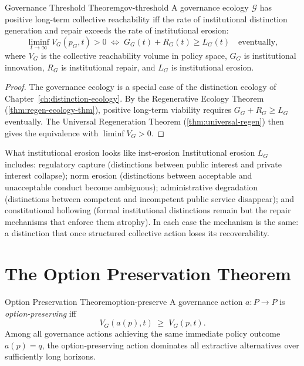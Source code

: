 \documentclass[12pt,twoside,openright]{book}
\begin{document}
\begin{theorem}{Governance Threshold Theorem}{gov-threshold}
  A governance ecology $\mathcal{G}$ has positive
  long-term collective reachability iff
  the rate of institutional distinction generation
  and repair exceeds the rate of institutional erosion:
  \[
    \liminf_{t\to\infty}
    V_G(p_G, t) > 0
    \;\iff\;
    G_G(t) + R_G(t) \ge L_G(t)
    \quad \text{eventually},
  \]
  where $V_G$ is the collective reachability volume in
  policy space, $G_G$ is institutional innovation,
  $R_G$ is institutional repair, and $L_G$ is
  institutional erosion.
\end{theorem}

\begin{proof}
  The governance ecology is a special case of the
  distinction ecology of Chapter~\ref{ch:distinction-ecology}.
  By the Regenerative Ecology Theorem
  (\cref{thm:regen-ecology-thm}), positive long-term
  viability requires $G_G + R_G \ge L_G$ eventually.
  The Universal Regeneration Theorem
  (\cref{thm:universal-regen}) then gives the
  equivalence with $\liminf V_G > 0$.
\end{proof}

\begin{remark}{What institutional erosion looks like}%
  {inst-erosion}
  Institutional erosion $L_G$ includes: regulatory
  capture (distinctions between public interest and
  private interest collapse); norm erosion (distinctions
  between acceptable and unacceptable conduct become
  ambiguous); administrative degradation (distinctions
  between competent and incompetent public service
  disappear); and constitutional hollowing
  (formal institutional distinctions remain but
  the repair mechanisms that enforce them atrophy).
  In each case the mechanism is the same:
  a distinction that once structured collective action
  loses its recoverability.
\end{remark}

\section{The Option Preservation Theorem}

\begin{theorem}{Option Preservation Theorem}{option-preserve}
  A governance action $a: P \to P$ is \emph{option-preserving}
  iff
  \[
    V_G(a(p), t) \;\ge\; V_G(p, t).
  \]
  Among all governance actions achieving the same
  immediate policy outcome $a(p) = q$, the
  option-preserving action dominates all extractive
  alternatives over sufficiently long horizons.
\end{theorem}
\end{document}
